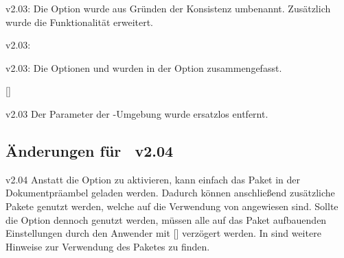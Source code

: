 \begin{Obsolete}{v2.03:}{}
\printobsoletelist%
%
Die Option  wurde aus Gründen der Konsistenz umbenannt. 
Zusätzlich wurde die Funktionalität erweitert.
\end{Obsolete}

\begin{Obsolete}{v2.03:}{}
\begin{Obsolete}{v2.03:}{}
\printobsoletelist%
%
Die Optionen  und  wurden in der Option 
 zusammengefasst.
\end{Obsolete}
\end{Obsolete}

\begin{Obsolete}{}{[]}
\begin{Obsolete}{v2.03}{}
\printobsoletelist%
%
Der Parameter  der 
-Umgebung wurde ersatzlos entfernt.
\end{Obsolete}
\end{Obsolete}


%
\subsection{Änderungen für \TUDScript~v2.04}
\begin{Obsolete}{v2.04}{}%
\printobsoletelist%
%
Anstatt die Option  zu aktivieren, kann einfach das Paket 
 in der Dokumentpräambel geladen werden. Dadurch können 
anschließend zusätzliche Pakete genutzt werden, welche auf die Verwendung von 
 angewiesen sind. Sollte die Option  
dennoch genutzt werden, müssen alle auf das Paket  
aufbauenden Einstellungen durch den Anwender mit 
[\PParameter{\dots}] 
verzögert werden. In  sind weitere Hinweise zur 
Verwendung des Paketes  zu finden.
\end{Obsolete}


